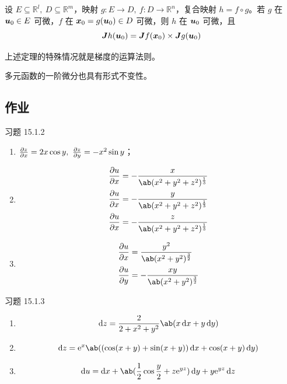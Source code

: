 \begin{theorem}
    设 $E \subseteq \mathbb{R}^{l},\ D \subseteq \mathbb{R}^{m}$，映射 $g: E \to D,\ f: D \to \mathbb{R}^{n}$，复合映射 $h = f \circ g$。若 $g$ 在 $\boldsymbol{u}_0 \in E$ 可微，$f$ 在 $\boldsymbol{x}_0 = g(\boldsymbol{u}_0) \in D$ 可微，则 $h$ 在 $\boldsymbol{u}_0$ 可微，且
    $$
    \boldsymbol{J} h(\boldsymbol{u}_0) = \boldsymbol{J} f(\boldsymbol{x}_0) \times \boldsymbol{J} g(\boldsymbol{u}_0)
    $$
\end{theorem}

上述定理的特殊情况就是梯度的运算法则。

多元函数的一阶微分也具有形式不变性。

\subsection{作业}

\begin{problem}
    习题 15.1.2
    \begin{solution}
        \begin{enumerate}
            \item[\textbf{1)}] $\pdv{z}{x} = 2x \cos y,\ \pdv{z}{y} = -x^2 \sin y$；
            \item[\textbf{3)}]
            $$
            \begin{aligned}
                \pdv{u}{x} & = -\frac{x}{\ab(x^2 + y^2 + z^2)^{\frac{1}{3}}} \\
                \pdv{u}{x} & = -\frac{y}{\ab(x^2 + y^2 + z^2)^{\frac{1}{3}}} \\
                \pdv{u}{x} & = -\frac{z}{\ab(x^2 + y^2 + z^2)^{\frac{1}{3}}}
            \end{aligned}
            $$
            \item[\textbf{5)}]
            $$
            \begin{aligned}
                \pdv{u}{x} & = \frac{y^2}{\ab(x^2 + y^2)^{\frac{3}{2}}} \\
                \pdv{u}{y} & = -\frac{xy}{\ab(x^2 + y^2)^{\frac{3}{2}}}
            \end{aligned}
            $$
        \end{enumerate}
    \end{solution}
\end{problem}

\begin{problem}
    习题 15.1.3
    \begin{solution}
        \begin{enumerate}
            \item[\textbf{2)}]
            $$
            \dd{z} = \frac{2}{2 + x^2 + y^2} \ab(x \dd{x} + y \dd{y})
            $$
            \item[\textbf{4)}]
            $$
            \dd{z} = \E^{x} \ab((\cos (x + y) + \sin (x + y)) \dd{x} + \cos (x + y) \dd{y})
            $$
            \item[\textbf{6)}]
            $$
            \dd{u} = \dd{x} + \ab(\frac{1}{2} \cos \frac{y}{2} + z \E^{y z}) \dd{y} + y \E^{y z} \dd{z}
            $$
        \end{enumerate}
    \end{solution}
\end{problem}

